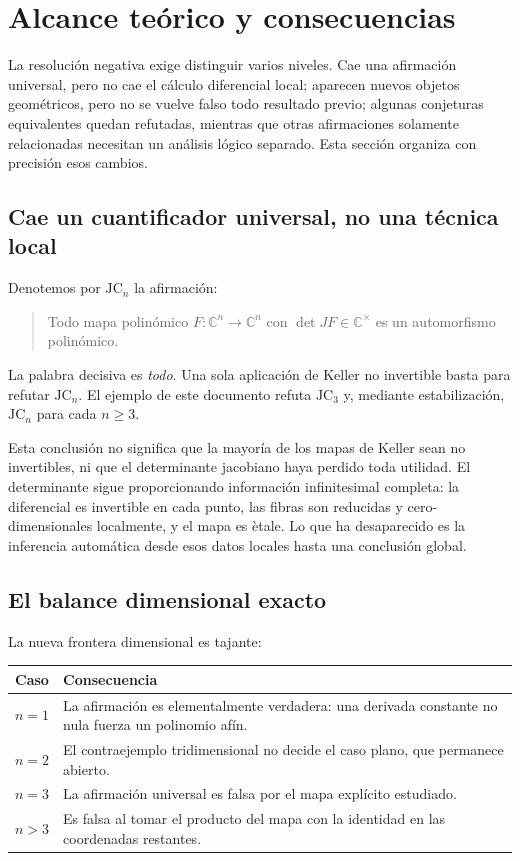 \documentclass[11pt]{article}
\theoremstyle{definition}
\theoremstyle{remark}
\newcommand{\C}{\mathbb{C}}
\begin{document}
\section{Alcance te\'orico y consecuencias}
\label{sec:what-changes}

La resoluci\'on negativa exige distinguir varios niveles. Cae una afirmaci\'on
universal, pero no cae el c\'alculo diferencial local; aparecen nuevos objetos
geom\'etricos, pero no se vuelve falso todo resultado previo; algunas
conjeturas equivalentes quedan refutadas, mientras que otras afirmaciones
solamente relacionadas necesitan un an\'alisis l\'ogico separado. Esta secci\'on
organiza con precisi\'on esos cambios.

\subsection{Cae un cuantificador universal, no una t\'ecnica local}

Denotemos por $\mathrm{JC}_n$ la afirmaci\'on:
\begin{quote}
Todo mapa polin\'omico $F\colon\C^n\to\C^n$ con
$\det JF\in\C^\times$ es un automorfismo polin\'omico.
\end{quote}

La palabra decisiva es \emph{todo}. Una sola aplicaci\'on de Keller no
invertible basta para refutar $\mathrm{JC}_n$. El ejemplo de este documento
refuta $\mathrm{JC}_3$ y, mediante estabilizaci\'on, $\mathrm{JC}_n$ para cada
$n\geq3$.

Esta conclusi\'on no significa que la mayor\'ia de los mapas de Keller sean no
invertibles, ni que el determinante jacobiano haya perdido toda utilidad. El
determinante sigue proporcionando informaci\'on infinitesimal completa: la
diferencial es invertible en cada punto, las fibras son reducidas y
cero-dimensionales localmente, y el mapa es \`etale. Lo que ha desaparecido es
la inferencia autom\'atica desde esos datos locales hasta una conclusi\'on
global.

\subsection{El balance dimensional exacto}

La nueva frontera dimensional es tajante:
\begin{center}
\begin{tabular}{@{}p{}p{}@{}}
\toprule
Caso & Consecuencia \\
\midrule
$n=1$ & La afirmaci\'on es elementalmente verdadera: una derivada constante no
nula fuerza un polinomio af\'in. \\
$n=2$ & El contraejemplo tridimensional no decide el caso plano, que permanece
abierto. \\
$n=3$ & La afirmaci\'on universal es falsa por el mapa expl\'icito estudiado. \\
$n>3$ & Es falsa al tomar el producto del mapa con la identidad en las
coordenadas restantes. \\
\bottomrule
\end{tabular}
\end{center}
\end{document}
